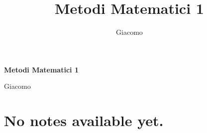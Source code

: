 \documentclass{article}
\title{Metodi Matematici 1}
\author{Giacomo}
\begin{document}
\begin{titlepage}

    \centering
    {\Huge\bfseries Metodi Matematici 1\par}
    \vspace{1.5cm}
    {\large Giacomo\par}
\end{titlepage}





\section*{No notes available yet.}
\end{document}
